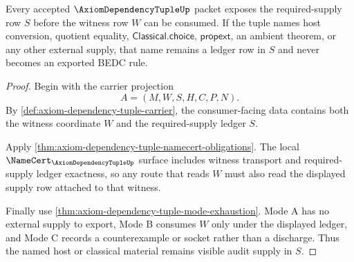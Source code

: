 \begin{theorem}
\label{thm:axiom-dependency-tuple-supply-ledger-readback}
Every accepted $\AxiomDependencyTupleUp$ packet exposes the required-supply row
$S$ before the witness row $W$ can be consumed. If the tuple names host
conversion, quotient equality, $\mathsf{Classical.choice}$,
$\mathsf{propext}$, an ambient theorem, or any other external supply, that name
remains a ledger row in $S$ and never becomes an exported BEDC rule.
\end{theorem}
\begin{proof}
Begin with the carrier projection
$$
A=(M,W,S,H,C,P,N).
$$
By \autoref{def:axiom-dependency-tuple-carrier}, the consumer-facing data
contains both the witness coordinate $W$ and the required-supply ledger $S$.

Apply \autoref{thm:axiom-dependency-tuple-namecert-obligations}. The local
$\NameCert_{\AxiomDependencyTupleUp}$ surface includes witness transport and
required-supply ledger exactness, so any route that reads $W$ must also read the
displayed supply row attached to that witness.

Finally use \autoref{thm:axiom-dependency-tuple-mode-exhaustion}. Mode A has no
external supply to export, Mode B consumes $W$ only under the displayed ledger,
and Mode C records a counterexample or socket rather than a discharge. Thus the
named host or classical material remains visible audit supply in $S$.
\end{proof}

